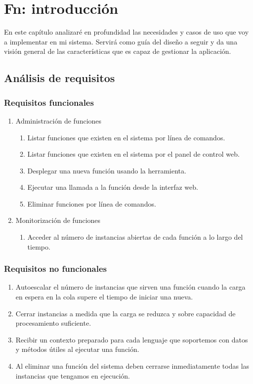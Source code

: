 \chapter{Fn: introducción}
\label{chap:fn-introduccion}

En este capítulo analizaré en profundidad las necesidades y casos de uso que voy a implementar en mi sistema. Servirá como guía del diseño a seguir y da una visión general de las características que es capaz de gestionar la aplicación.

\section{Análisis de requisitos}
\subsection{Requisitos funcionales}

\begin{enumerate}
    \item Administración de funciones
        \begin{enumerate}
            \item Listar funciones que existen en el sistema por línea de comandos.
            \item Listar funciones que existen en el sistema por el panel de control web.
            \item Desplegar una nueva función usando la herramienta.
            \item Ejecutar una llamada a la función desde la interfaz web.
            \item Eliminar funciones por línea de comandos.
        \end{enumerate}
    \item Monitorización de funciones
        \begin{enumerate}
            \item Acceder al número de instancias abiertas de cada función a lo largo del tiempo.
        \end{enumerate}
\end{enumerate}

\subsection{Requisitos no funcionales}
\begin{enumerate}
    \item Autoescalar el número de instancias que sirven una función cuando la carga en espera en la cola supere el tiempo de iniciar una nueva.
    \item Cerrar instancias a medida que la carga se reduzca y sobre capacidad de procesamiento suficiente.
    \item Recibir un contexto preparado para cada lenguaje que soportemos con datos y métodos útiles al ejecutar una función.
    \item Al eliminar una función del sistema deben cerrarse inmediatamente todas las instancias que tengamos en ejecución.
\end{enumerate}

